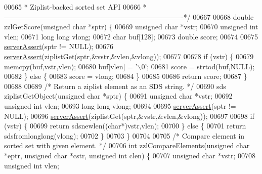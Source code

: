 \begin{DoxyCode}
00665 \textcolor{comment}{ * Ziplist-backed sorted set API}
00666 \textcolor{comment}{ *----------------------------------------------------------------------------*/}
00667 
00668 \textcolor{keywordtype}{double} zzlGetScore(\textcolor{keywordtype}{unsigned} \textcolor{keywordtype}{char} *sptr) \{
00669     \textcolor{keywordtype}{unsigned} \textcolor{keywordtype}{char} *vstr;
00670     \textcolor{keywordtype}{unsigned} \textcolor{keywordtype}{int} vlen;
00671     \textcolor{keywordtype}{long} \textcolor{keywordtype}{long} vlong;
00672     \textcolor{keywordtype}{char} buf[128];
00673     \textcolor{keywordtype}{double} score;
00674 
00675     \hyperlink{server_8h_a88114b5169b4c382df6b56506285e56a}{serverAssert}(sptr != NULL);
00676     \hyperlink{server_8h_a88114b5169b4c382df6b56506285e56a}{serverAssert}(ziplistGet(sptr,&vstr,&vlen,&vlong));
00677 
00678     \textcolor{keywordflow}{if} (vstr) \{
00679         memcpy(buf,vstr,vlen);
00680         buf[vlen] = \textcolor{stringliteral}{'\(\backslash\)0'};
00681         score = strtod(buf,NULL);
00682     \} \textcolor{keywordflow}{else} \{
00683         score = vlong;
00684     \}
00685 
00686     \textcolor{keywordflow}{return} score;
00687 \}
00688 
00689 \textcolor{comment}{/* Return a ziplist element as an SDS string. */}
00690 sds ziplistGetObject(\textcolor{keywordtype}{unsigned} \textcolor{keywordtype}{char} *sptr) \{
00691     \textcolor{keywordtype}{unsigned} \textcolor{keywordtype}{char} *vstr;
00692     \textcolor{keywordtype}{unsigned} \textcolor{keywordtype}{int} vlen;
00693     \textcolor{keywordtype}{long} \textcolor{keywordtype}{long} vlong;
00694 
00695     \hyperlink{server_8h_a88114b5169b4c382df6b56506285e56a}{serverAssert}(sptr != NULL);
00696     \hyperlink{server_8h_a88114b5169b4c382df6b56506285e56a}{serverAssert}(ziplistGet(sptr,&vstr,&vlen,&vlong));
00697 
00698     \textcolor{keywordflow}{if} (vstr) \{
00699         \textcolor{keywordflow}{return} sdsnewlen((\textcolor{keywordtype}{char}*)vstr,vlen);
00700     \} \textcolor{keywordflow}{else} \{
00701         \textcolor{keywordflow}{return} sdsfromlonglong(vlong);
00702     \}
00703 \}
00704 
00705 \textcolor{comment}{/* Compare element in sorted set with given element. */}
00706 \textcolor{keywordtype}{int} zzlCompareElements(\textcolor{keywordtype}{unsigned} \textcolor{keywordtype}{char} *eptr, \textcolor{keywordtype}{unsigned} \textcolor{keywordtype}{char} *cstr, \textcolor{keywordtype}{unsigned} \textcolor{keywordtype}{int} clen) \{
00707     \textcolor{keywordtype}{unsigned} \textcolor{keywordtype}{char} *vstr;
00708     \textcolor{keywordtype}{unsigned} \textcolor{keywordtype}{int} vlen;

\end{DoxyCode}
